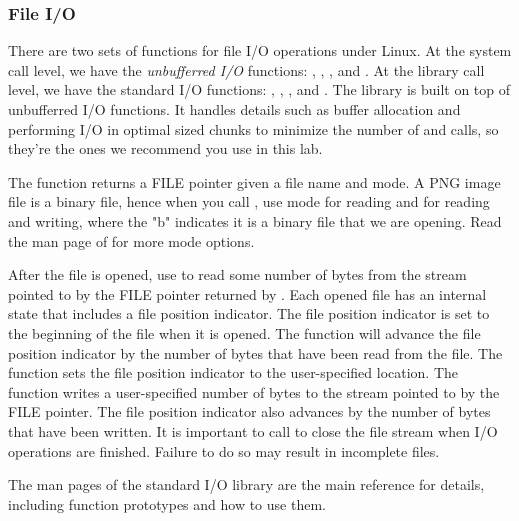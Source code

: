 \subsubsection{File I/O}
There are two sets of functions for file I/O operations under Linux. At the system call level, we have the {\em unbufferred I/O} functions: , , ,  and . At the library call level, we have the standard I/O functions: , , ,  and . The library is built on top of unbufferred I/O functions. It handles details such as buffer allocation and performing I/O in optimal sized chunks to minimize the number of  and  calls, so they're the ones we recommend you use in this lab.

The  function returns a FILE pointer given a file name and mode. A PNG image file is a binary file, hence when you call , use mode  for reading and  for reading and writing, where the "b" indicates it is a binary file that we are opening. Read the man page of  for more mode options. 

After the file is opened, use  to read some number of bytes from the stream pointed to by the FILE pointer returned by . Each opened file has an internal state that includes a file position indicator. The file position indicator is set to the beginning of the file when it is opened. The  function will advance the file position indicator by the number of bytes that have been read from the file. The  function sets the file position indicator to the user-specified location. The  function writes a user-specified number of bytes to the stream pointed to by the FILE pointer. The file position indicator also advances by the number of bytes that have been written. It is important to call  to close the file stream when I/O operations are finished. Failure to do so may result in incomplete files.  

The man pages of the standard I/O library are the main reference for details, including function prototypes and how to use them.   

